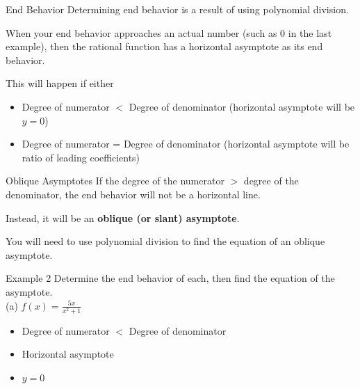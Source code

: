 \documentclass[t,usenames,dvipsnames]{beamer}
\begin{document}
\begin{frame}{End Behavior}
Determining end behavior is a result of using \alert{polynomial division}. \newline\\ \pause

When your end behavior approaches an actual number (such as 0 in the last example), then the rational function has a \alert{horizontal asymptote} as its end behavior. \newline\\ \pause

This will happen if either \newline\\
\begin{itemize}
    \item Degree of numerator $<$ Degree of denominator (horizontal asymptote will be $y = 0$)  \newline\\ \pause
    \item Degree of numerator = Degree of denominator (horizontal asymptote will be ratio of leading coefficients)
\end{itemize}
\end{frame}

\begin{frame}{Oblique Asymptotes}
If the degree of the numerator $>$ degree of the denominator, the end behavior \alert{will not be a horizontal line}. \newline\\ \pause

Instead, it will be an {\color{blue}\textbf{oblique (or slant) asymptote}}. \newline\\ \pause

You will need to use \alert{polynomial division} to find the equation of an oblique asymptote.
\end{frame}

\begin{frame}{Example 2}
Determine the end behavior of each, then find the equation of the asymptote.  \newline\\
(a) \quad $f(x) = \frac{5x}{x^2 + 1}$ \newline\\ \pause
\begin{itemize}
    \item Degree of numerator $<$ Degree of denominator \newline\\ \pause
    \item Horizontal asymptote \newline\\ \pause
    \item $y = 0$   \newline\\ \pause
\end{itemize}
\end{frame}
\end{document}
